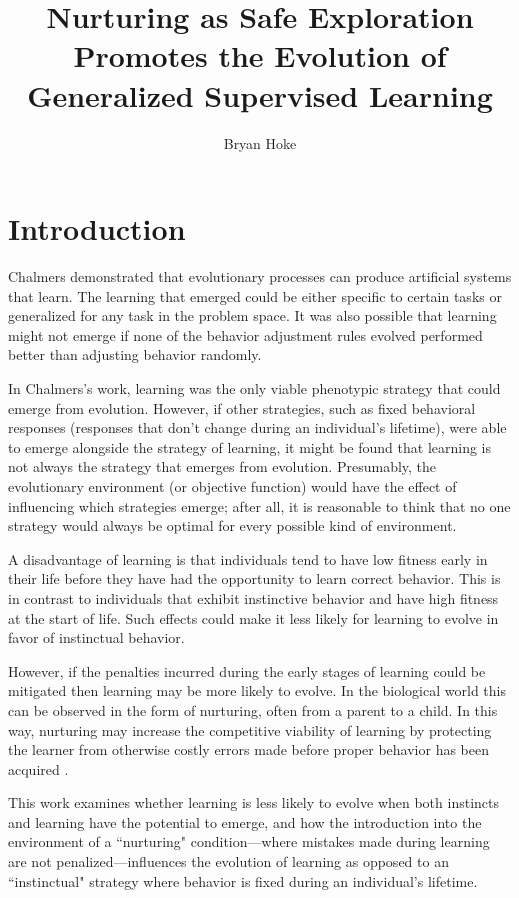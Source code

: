 \documentclass[master]{outhesis}
\title{Nurturing as Safe Exploration Promotes the Evolution of Generalized Supervised Learning}
\author{Bryan Hoke}
\begin{document}
\makefrontmatter

\chapter{Introduction}

Chalmers \cite{chalmers-evolution-learning} demonstrated that evolutionary processes can produce artificial systems that learn.
The learning that emerged could be either specific to certain tasks or generalized for any task in the problem space.
It was also possible that learning might not emerge if none of the behavior adjustment rules evolved performed better than adjusting behavior randomly.

In Chalmers's work, learning was the only viable phenotypic strategy that could emerge from evolution.
However, if other strategies, such as fixed behavioral responses (responses that don't change during an individual's lifetime), were able to emerge alongside the strategy of learning, it might be found that learning is not always the strategy that emerges from evolution.
Presumably, the evolutionary environment (or objective function) would have the effect of influencing which strategies emerge; after all, it is reasonable to think that no one strategy would always be optimal for every possible kind of environment. %

A disadvantage of learning is that individuals tend to have low fitness early in their life before they have had the opportunity to learn correct behavior.
This is in contrast to individuals that exhibit instinctive behavior and have high fitness at the start of life.
Such effects could make it less likely for learning to evolve in favor of instinctual behavior.

However, if the penalties incurred during the early stages of learning could be mitigated then learning may be more likely to evolve.
In the biological world this can be observed in the form of nurturing, often from a parent to a child.
In this way, nurturing may increase the competitive viability of learning by protecting the learner from otherwise costly errors made before proper behavior has been acquired \cite{nurturing-definition}.
                                                                                                                                    
This work examines whether learning is less likely to evolve when both instincts and learning have the potential to emerge,
and how the introduction into the environment of a ``nurturing" condition---where mistakes made during learning are not penalized---influences the evolution of learning as opposed to an ``instinctual" strategy where behavior is fixed during an individual's lifetime.
\end{document}
